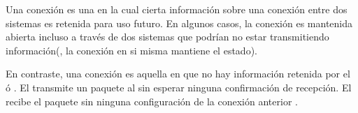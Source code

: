 Una conexión \statefulINT es una en la cual cierta información sobre una conexión entre dos sistemas es retenida para uso futuro. En algunos casos, la conexión es mantenida abierta incluso a través de dos sistemas que podrían no estar transmitiendo información(\ieCPT, la conexión en si misma mantiene el estado)\cite{online_connection_stateful_stateless}.

En contraste, una conexión \statelessINT es aquella en que no hay información retenida por el \senderINT ó \receiverINT. El \senderINT transmite un paquete al \receiverINT sin esperar ninguna confirmación de recepción. El \receiverINT recibe el paquete sin ninguna configuración de la conexión anterior  \cite{online_connection_stateful_stateless}.


		